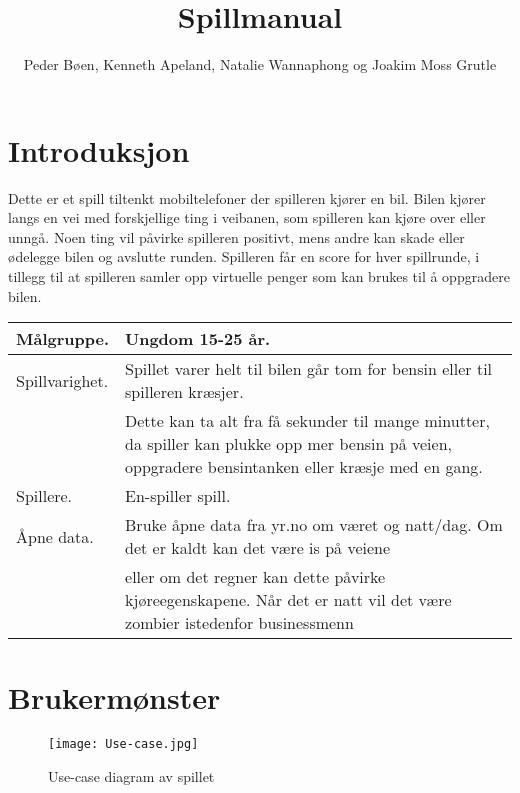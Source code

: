 \documentclass[paper=a4]{article}
\title{Spillmanual}
\author{Peder Bøen, Kenneth Apeland, Natalie Wannaphong og Joakim Moss Grutle}
\begin{document}
\maketitle

\section{Introduksjon}
Dette er et spill tiltenkt mobiltelefoner der spilleren kjører en bil.
Bilen kjører langs en vei med forskjellige ting i veibanen, som spilleren kan kjøre over eller unngå.
Noen ting vil påvirke spilleren positivt, mens andre kan skade eller ødelegge bilen og avslutte runden.
Spilleren får en score for hver spillrunde, i tillegg til at spilleren samler opp virtuelle penger som kan brukes til å oppgradere bilen.
\begin{center}
\begin{tabular}{ | m{5cm} | m{8cm} | }
\hline
Målgruppe. & Ungdom 15-25 år. \\ \hline
Spillvarighet. & Spillet varer helt til bilen går tom for bensin eller til spilleren kræsjer.\\&
Dette kan ta alt fra få sekunder til mange minutter, da spiller kan plukke opp mer bensin på veien,
oppgradere bensintanken eller kræsje med en gang.\\ \hline
Spillere. & En-spiller spill. \\ \hline
Åpne data. & Bruke åpne data fra yr.no om været og natt/dag. Om det er kaldt kan det være is på veiene\\&
eller om det regner kan dette påvirke kjøreegenskapene. Når det er natt vil det være zombier istedenfor businessmenn\\ \hline
\end{tabular}
\end{center}

\section{Brukermønster}
\begin{figure}\begin{center}
\texttt{[image: Use-case.jpg]}
\caption{Use-case diagram av spillet}
\end{center}\end{figure}
\end{document}

